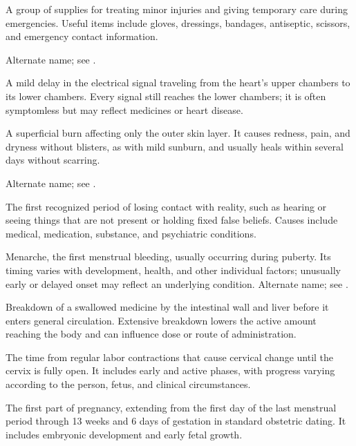  A group of supplies for treating minor injuries and giving temporary care during emergencies. Useful items include gloves, dressings, bandages, antiseptic, scissors, and emergency contact information.

 Alternate name; see .

 A mild delay in the electrical signal traveling from the heart’s upper chambers to its lower chambers. Every signal still reaches the lower chambers; it is often symptomless but may reflect medicines or heart disease.

 A superficial burn affecting only the outer skin layer. It causes redness, pain, and dryness without blisters, as with mild sunburn, and usually heals within several days without scarring.

 Alternate name; see .

 The first recognized period of losing contact with reality, such as hearing or seeing things that are not present or holding fixed false beliefs. Causes include medical, medication, substance, and psychiatric conditions.

 Menarche, the first menstrual bleeding, usually occurring during puberty. Its timing varies with development, health, and other individual factors; unusually early or delayed onset may reflect an underlying condition.
 Alternate name; see .

 Breakdown of a swallowed medicine by the intestinal wall and liver before it enters general circulation. Extensive breakdown lowers the active amount reaching the body and can influence dose or route of administration.

 The time from regular labor contractions that cause cervical change until the cervix is fully open. It includes early and active phases, with progress varying according to the person, fetus, and clinical circumstances.

 The first part of pregnancy, extending from the first day of the last menstrual period through 13 weeks and 6 days of gestation in standard obstetric dating. It includes embryonic development and early fetal growth.

